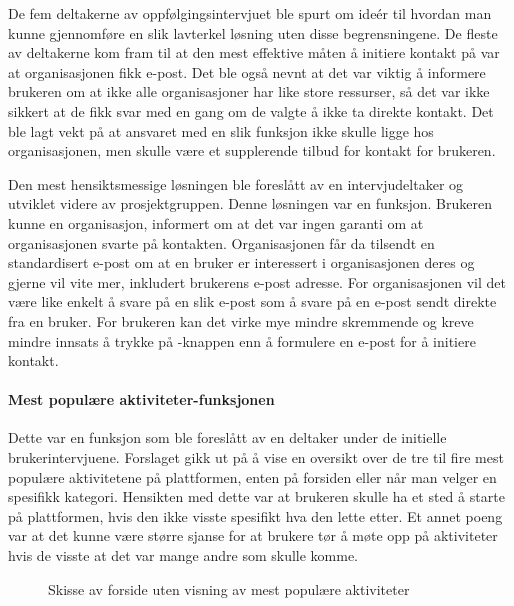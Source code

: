 De fem deltakerne av oppfølgingsintervjuet ble spurt om ideér til hvordan man kunne gjennomføre en slik lavterkel løsning uten disse begrensningene. De fleste av deltakerne kom fram til at den mest effektive måten å initiere kontakt på var at organisasjonen fikk e-post. Det ble også nevnt at det var viktig å informere brukeren om at ikke alle organisasjoner har like store ressurser, så det var ikke sikkert at de fikk svar med en gang om de valgte å ikke ta direkte kontakt. Det ble lagt vekt på at ansvaret med en slik funksjon ikke skulle ligge hos organisasjonen, men skulle være et supplerende tilbud for kontakt for brukeren. 

Den mest hensiktsmessige løsningen ble foreslått av en intervjudeltaker og utviklet videre av prosjektgruppen. Denne løsningen var en  funksjon. Brukeren kunne  en organisasjon, informert om at det var ingen garanti om at organisasjonen svarte på kontakten. Organisasjonen får da tilsendt en standardisert e-post om at en bruker er interessert i organisasjonen deres og gjerne vil vite mer, inkludert brukerens e-post adresse. For organisasjonen vil det være like enkelt å svare på en slik e-post som å svare på en e-post sendt direkte fra en bruker. For brukeren kan det virke mye mindre skremmende og kreve mindre innsats å trykke på -knappen enn å formulere en e-post for å initiere kontakt.

\paragraph{Mest populære aktiviteter-funksjonen}
Dette var en funksjon som ble foreslått av en deltaker under de initielle brukerintervjuene. Forslaget gikk ut på å vise en oversikt over de tre til fire mest populære aktivitetene på plattformen, enten på forsiden eller når man velger en spesifikk kategori. Hensikten med dette var at brukeren skulle ha et sted å starte på plattformen, hvis den ikke visste spesifikt hva den lette etter. Et annet poeng var at det kunne være større sjanse for at brukere tør å møte opp på aktiviteter hvis de visste at det var mange andre som skulle komme.

\begin{figure}[H]
\caption{Skisse av forside uten visning av mest populære aktiviteter}
\label{fig:utenMestPopulaere}
\end{figure}

